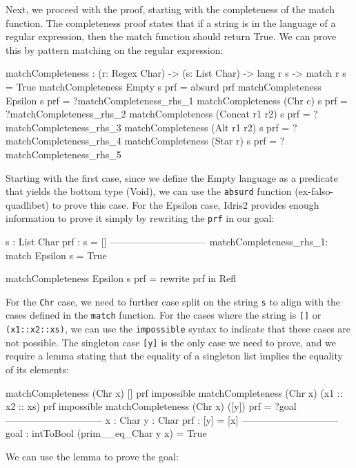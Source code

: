 \documentclass[]{rptuseminar}
\begin{document}
Next, we proceed with the proof, starting with the completeness of the match function. The completeness proof states that if a string is in the language of a regular expression, then the match function should return True. We can prove this by pattern matching on the regular expression:

\begin{idris}
matchCompleteness : (r: Regex Char) -> (s: List Char) ->
    lang r s -> match r s = True
matchCompleteness Empty s prf = absurd prf
matchCompleteness Epsilon s prf = ?matchCompleteness_rhs_1
matchCompleteness (Chr c) s prf = ?matchCompleteness_rhs_2
matchCompleteness (Concat r1 r2) s prf = ?matchCompleteness_rhs_3
matchCompleteness (Alt r1 r2) s prf = ?matchCompleteness_rhs_4
matchCompleteness (Star r) s prf = ?matchCompleteness_rhs_5
\end{idris}

Starting with the first case, since we define the Empty language as a predicate that yields the bottom type (Void), we can use the \texttt{absurd} function (ex-falso-quadlibet) to prove this case. For the Epsilon case, Idris2 provides enough information to prove it simply by rewriting the \texttt{prf} in our goal:

\begin{idris}
s : List Char
prf : s = []
------------------------------
matchCompleteness_rhs_1: match Epsilon s = True

matchCompleteness Epsilon s prf = rewrite prf in Refl
\end{idris}

For the \texttt{Chr} case, we need to further case split on the string \texttt{s} to align with the cases defined in the \texttt{match} function. For the cases where the string is \texttt{[]} or \texttt{(x1::x2::xs)}, we can use the \texttt{impossible} syntax to indicate that these cases are not possible. The singleton case \texttt{[y]} is the only case we need to prove, and we require a lemma stating that the equality of a singleton list implies the equality of its elements:

\begin{idris}
matchCompleteness (Chr x) [] prf impossible 
matchCompleteness (Chr x) (x1 :: x2 :: xs) prf impossible 
matchCompleteness (Chr x) ([y]) prf = ?goal
------------------------------
x : Char
y : Char
prf : [y] = [x]
------------------------------
goal : intToBool (prim__eq_Char y x) = True
\end{idris}

We can use the lemma to prove the goal:
\end{document}
